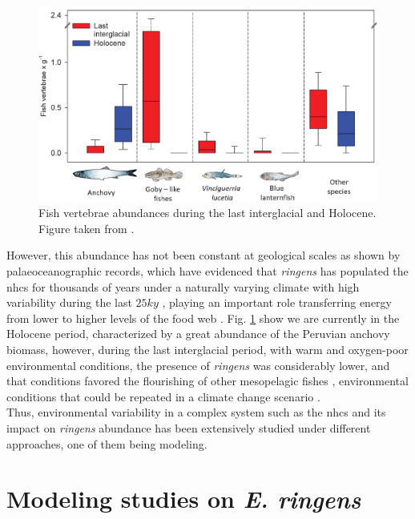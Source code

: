 \begin{figure}[!]
	\includegraphics[width=1.0\textwidth]{figures/Chap1VertebraeAbundances.png}
	\centering
	\caption{Fish vertebrae abundances during the last interglacial and Holocene. Figure taken from \cite{SalvSchn2022}.}
	\label{Chap1VertebraeAbundances}
\end{figure}

However, this abundance has not been constant at geological scales as shown by palaeoceanographic records, which have evidenced that \textit{\gls{ringens}} has populated the \acrshort{nhcs} for thousands of years under a naturally varying climate with high variability during the last $25 ky$ \citep{SalvField2018,SalvGuti2019,SalvSchn2022}, playing an important role transferring energy from lower to higher levels of the food web \citep{ChecAsch2017}. Fig. \ref{Chap1VertebraeAbundances} show we are currently in the Holocene period, characterized by a great abundance of the Peruvian anchovy biomass, however, during the last interglacial period, with warm and oxygen-poor environmental conditions, the presence of \textit{\gls{ringens}} was considerably lower, and that conditions favored the flourishing of other mesopelagic fishes \citep{SalvSchn2022}, environmental conditions that could be repeated in a climate change scenario \citep{EcheGeva2020}.\\

Thus, environmental variability in a complex system such as the \acrshort{nhcs} and its impact on \textit{\gls{ringens}} abundance has been extensively studied under different approaches, one of them being modeling.\\

\clearpage
\section{Modeling studies on \textit{E. ringens}}\label{Chap1ModeAnch}

